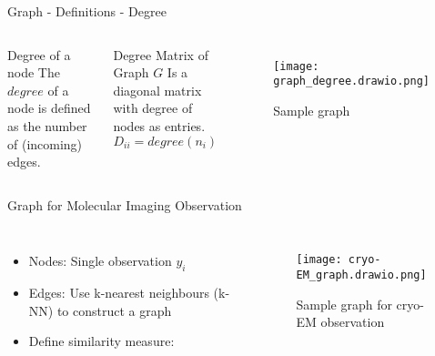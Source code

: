 \begin{frame}{Graph - Definitions - Degree}
  \begin{columns}
  
    \begin{block}{Degree of a node}
      The $degree$ of a node is defined as the number of (incoming) edges.
    \end{block}

    \begin{block}{Degree Matrix of Graph $G$}
      Is a diagonal matrix with degree of nodes as entries.
      $$D_{ii} = degree(n_i)$$
    \end{block}
  
    \pause

    \begin{figure}
      \centering
      \texttt{[image: graph\_degree.drawio.png]}
      \caption{Sample graph}        
    \end{figure}
  
  \end{columns}
  
  \end{frame}

\begin{frame}{Graph for Molecular Imaging Observation}
  \begin{columns}
    \begin{itemize}
      \item Nodes: Single observation $y_i$
      \item Edges: Use k-nearest neighbours (k-NN) to construct a graph
      \item Define similarity measure:
      
    \end{itemize}

    \pause
    \begin{figure}
      \centering
      \texttt{[image: cryo-EM\_graph.drawio.png]}
      \caption{Sample graph for cryo-EM observation}        
    \end{figure}
  

  \end{columns}
\end{frame}


